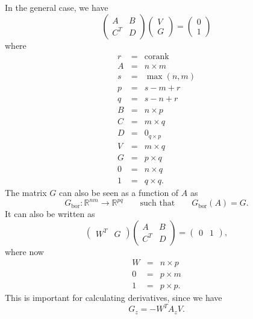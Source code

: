 \documentclass{article}[12pt]
\begin{document}
In the general case, we have
\begin{equation}
\left(\begin{array}{cc}
A & B \\
C^{T} & D
\end{array}\right)
\left(\begin{array}{c}
V \\
G
\end{array}\right) = 
\left(\begin{array}{c}
0 \\
1
\end{array}\right)
\label{eq:bord1}
\end{equation}
where
\begin{eqnarray*}
r & = & \mbox{corank} \\
A & = & n\times m \\
s & = & \max(n,m) \\
p & = & s-m+r \\
q & = & s-n+r \\
B & = & n\times p \\
C & = & m\times q \\
D & = & 0_{q\times p} \\
V & = & m\times q \\
G & = & p\times q \\
0 & = & n\times q \\
1 & = & q\times q.
\end{eqnarray*}
The matrix $G$ can also be seen as a function of $A$ as
\[
G_{\mathrm{bor}}:\mathbb{R}^{nm} \rightarrow \mathbb{R}^{pq} \qquad \mbox{such that} \qquad G_{\mathrm{bor}}(A) = G.
\]
It can also be written as
\begin{equation}
\left(\begin{array}{cc} W^{T} & G \end{array}\right)
\left(\begin{array}{cc}
A & B \\
C^{T} & D
\end{array}\right) =
\left(\begin{array}{cc} 0 & 1 \end{array}\right),
\label{eq:bord2}
\end{equation}
where now
\begin{eqnarray*}
W & = & n\times p \\
0 & = & p\times m \\
1 & = & p\times p.
\end{eqnarray*}
This is important for calculating derivatives, since we have
\[
G_{z} = -W^T A_{z} V.
\]
\end{document}
